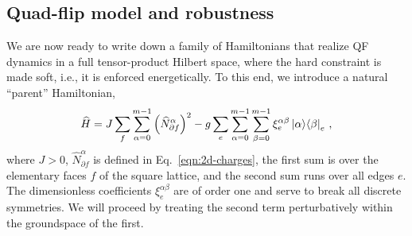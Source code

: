 
\subsection{Quad-flip model and robustness}
\label{sec:QF-Hamiltonian}

We are now ready to write down a family of Hamiltonians that realize QF dynamics in a full tensor-product Hilbert space, where the hard constraint is made soft, i.e., it is enforced energetically.
To this end, we introduce a natural ``parent'' Hamiltonian,
%
%
\begin{equation}
    \widehat{H} = J \sum_{f} \sum_{\alpha=0}^{m-1} \left( \widehat{N}^\alpha_{\partial f} \right)^2 - g \sum_e \sum_{\alpha=0}^{m-1}\sum_{\beta=0}^{m-1} \xi_{e}^{\alpha\beta} \ket{\alpha}\!\bra{\beta}_e
    \, , \label{eqn:QF-parent}
\end{equation}
%
%
where $J>0$, $\hat{N}^\alpha_{\partial f}$ is defined in Eq.~\eqref{eqn:2d-charges}, the first sum is over the elementary faces $f$ of the square lattice, and the second sum runs over all edges $e$. The dimensionless coefficients $\xi_e^{\alpha\beta}$ are of order one and serve to break all discrete symmetries. We will proceed by treating the second term perturbatively within the groundspace of the first.

